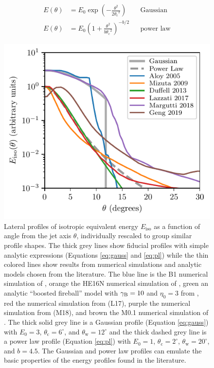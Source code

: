 \documentclass[twocolumn]{aastex62}
\newcommand{\thW}{\ensuremath{\theta_{\mathrm{w}}}}
\newcommand{\thC}{\ensuremath{\theta_{\mathrm{c}}}}
\newcommand{\Eiso}{\ensuremath{E_{\mathrm{iso}}}}
\begin{document}
\begin{align}
	E(\theta) &= E_0 \exp\left(-\frac{\theta^2}{2\thC^2}\right)  && \text{Gaussian} \label{eq:gauss}\\
	E(\theta) &= E_0 \left(1 + \frac{\theta^2}{b\thC^2} \right)^{-b/2}  && \text{power law} \label{eq:pl}
\end{align}

\begin{figure}
	\includegraphics[width=\columnwidth]{figs/jetStructureComparison.pdf}
	\caption{Lateral profiles of isotropic equivalent energy $\Eiso$ as a function of angle from the jet axis $\theta$, individually rescaled to group similar profile shapes.  The thick grey lines show fiducial profiles with simple analytic expressions (Equations \eqref{eq:gauss} and \eqref{eq:pl}) while the thin colored lines show results from numerical simulations and analytic models chosen from the literature.  The blue line is the B1 numerical simulation of \cite{Aloy:2005aa}, orange the HE16N numerical simulation of \cite{Mizuta:2009aa}, green an analytic ``boosted fireball'' model with $\gamma_{\rm{B}}=10$ and $\eta_0=3$ from \cite{Duffell:2013aa}, red the numerical simulation from \cite{Lazzati:2017aa} (L17), purple the numerical simulation from \cite{Margutti:2018aa} (M18), and brown the M0.1 numerical simulation of \cite{Geng:2019aa}.  The thick solid grey line is a Gaussian profile (Equation \eqref{eq:gauss}) with $E_0 = 3$, $\thC = 6^\circ$, and $\thW=12^\circ$ and the thick dashed grey line is a power law profile (Equation \eqref{eq:pl}) with $E_0 = 1$, $\thC = 2^\circ$, $\thW=20^\circ$, and $b=4.5$.  The Gaussian and power law profiles can emulate the basic properties of the energy profiles found in the literature. \label{fig:jetStruct}}
\end{figure}
\end{document}
